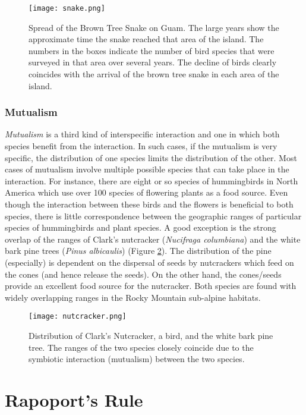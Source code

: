 \documentclass[11pt, hidelinks]{article}
\begin{document}
\begin{figure}
	\centering
	\texttt{[image: snake.png]}
	\caption{Spread of the Brown Tree Snake on Guam. The large years show the approximate time the snake reached that area of the island. The numbers in the boxes indicate the number of bird species that were surveyed in that area over several years. The decline of birds clearly coincides with the arrival of the brown tree snake in each area of the island.\label{brown tree snake}}
\end{figure}


\subsubsection{Mutualism}

\emph{Mutualism} is a third kind of interspecific interaction and one in which both species benefit from the interaction. In such cases, if the mutualism is very specific, the distribution of one species limits the distribution of the other. Most cases of mutualism involve multiple possible species that can take place in the interaction. For instance, there are eight or so species of hummingbirds in North America which use over 100 species of flowering plants as a food source. Even though the interaction between these birds and the flowers is beneficial to both species, there is little correspondence between the geographic ranges of particular species of hummingbirds and plant species. A good exception is the strong overlap of the ranges of Clark's nutcracker (\emph{Nucifraga columbiana}) and the white bark pine trees (\emph{Pinus albicaulis}) (Figure \ref{nutcracker}). The distribution of the pine (especially) is dependent on the dispersal of seeds by nutcrackers which feed on the cones (and hence release the seeds). On the other hand, the cones/seeds provide an excellent food source for the nutcracker. Both species are found with widely overlapping ranges in the Rocky Mountain sub-alpine habitats.

\begin{figure}[tb]
	\centering
	\texttt{[image: nutcracker.png]}
	\caption{Distribution of Clark's Nutcracker, a bird, and the white bark pine tree. The ranges of the two species closely coincide due to the symbiotic interaction (mutualism) between the two species.\label{nutcracker}}
\end{figure}

\section{Rapoport's Rule}
\end{document}
